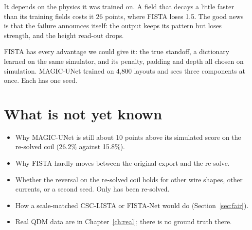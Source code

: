 \begin{defend}
It depends on the physics it was trained on. A field that decays a little faster than its training fields costs it 26
points, where FISTA loses 1.5. The good news is that the failure announces itself: the output keeps its pattern but
loses strength, and the height read-out drops.
\end{defend}

\begin{defend}
FISTA has every advantage we could give it: the true standoff, a dictionary learned on the same simulator, and its
penalty, padding and depth all chosen on simulation. MAGIC-UNet trained on 4{,}800 layouts and sees three components at
once. Each has one seed.
\end{defend}

\section{What is not yet known}

\begin{itemize}
\item Why MAGIC-UNet is still about 10 points above its simulated score on the re-solved coil (26.2\% against 15.8\%).
\item Why FISTA hardly moves between the original export and the re-solve.
\item Whether the reversal on the re-solved coil holds for other wire shapes, other currents, or a second seed. Only
 has been re-solved.
\item How a scale-matched CSC-LISTA or FISTA-Net would do (Section~\ref{sec:fair}).
\item Real QDM data are in Chapter~\ref{ch:real}; there is no ground truth there.
\end{itemize}
